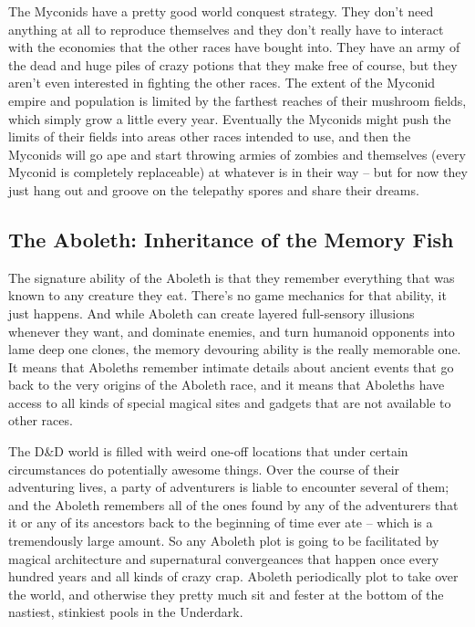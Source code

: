 The Myconids have a pretty good world conquest strategy. They don't need anything at all to reproduce themselves and they don't really have to interact with the economies that the other races have bought into. They have an army of the dead and huge piles of crazy potions that they make free of course, but they aren't even interested in fighting the other races. The extent of the Myconid empire and population is limited by the farthest reaches of their mushroom fields, which simply grow a little every year. Eventually the Myconids might push the limits of their fields into areas other races intended to use, and then the Myconids will go ape and start throwing armies of zombies and themselves (every Myconid is completely replaceable) at whatever is in their way -- but for now they just hang out and groove on the telepathy spores and share their dreams.

\subsection{The Aboleth: Inheritance of the Memory Fish}

The signature ability of the Aboleth is that they remember everything that was known to any creature they eat. There's no game mechanics for that ability, it just happens. And while Aboleth can create layered full-sensory illusions whenever they want, and dominate enemies, and turn humanoid opponents into lame deep one clones, the memory devouring ability is the really memorable one. It means that Aboleths remember intimate details about ancient events that go back to the very origins of the Aboleth race, and it means that Aboleths have access to all kinds of special magical sites and gadgets that are not available to other races.

The D\&D world is filled with weird one-off locations that under certain circumstances do potentially awesome things. Over the course of their adventuring lives, a party of adventurers is liable to encounter several of them; and the Aboleth remembers all of the ones found by any of the adventurers that it or any of its ancestors back to the beginning of time ever ate -- which is a tremendously large amount. So any Aboleth plot is going to be facilitated by magical architecture and supernatural convergeances that happen once every hundred years and all kinds of crazy crap. Aboleth periodically plot to take over the world, and otherwise they pretty much sit and fester at the bottom of the nastiest, stinkiest pools in the Underdark.

